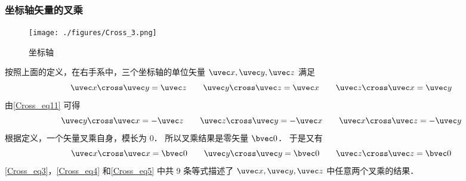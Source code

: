 \subsubsection{坐标轴矢量的叉乘}
\begin{figure}[ht]
\centering
\texttt{[image: ./figures/Cross\_3.png]}
\caption{坐标轴} \label{Cross_fig3}
\end{figure}
按照上面的定义，在右手系中，三个坐标轴的单位矢量 $\uvec x, \uvec y, \uvec z$ 满足
\begin{equation}\label{Cross_eq3}
\uvec x \cross \uvec y = \uvec z
\qquad
\uvec y \cross \uvec z = \uvec x
\qquad
\uvec z \cross \uvec x = \uvec y
\end{equation}
由\autoref{Cross_eq11} 可得
\begin{equation}\label{Cross_eq4}
\uvec y \cross \uvec x =  - \uvec z
\qquad
\uvec z \cross \uvec y =  - \uvec x
\qquad
\uvec x \cross \uvec z =  - \uvec y
\end{equation}
根据定义，一个矢量叉乘自身，模长为 $0$． 所以叉乘结果是零矢量 $\bvec 0$． 于是又有
\begin{equation}\label{Cross_eq5}
\uvec x \cross \uvec x = \bvec 0
\qquad
\uvec y \cross \uvec y = \bvec 0
\qquad
\uvec z \cross \uvec z = \bvec 0
\end{equation}
\autoref{Cross_eq3}，\autoref{Cross_eq4} 和\autoref{Cross_eq5} 中共 9 条等式描述了 $\uvec x, \uvec y, \uvec z$ 中任意两个叉乘的结果．

